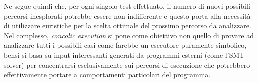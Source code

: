 \documentclass[Lau, oneside]{sapthesis}%
\begin{document}
\newline
Ne segue quindi che, per ogni singolo test effettuato, il numero di nuovi possibili percorsi inesplorati potrebbe essere non indifferente e questo porta alla necessità di utilizzare euristiche per la scelta ottimale del prossimo percorso da analizzare.
\newline \newline \newline
Nel complesso, \textit{concolic execution} si pone come obiettivo non quello di provare ad  analizzare tutti i possibili casi come farebbe un esecutore puramente simbolico, bensì si basa su input interessanti generati da programmi esterni (come l'SMT solver) per concentrarsi esclusivamente sui percorsi di esecuzione che potrebbero effettivamente portare a comportamenti particolari del programma.
\newline \newline






\newpage
\end{document}
